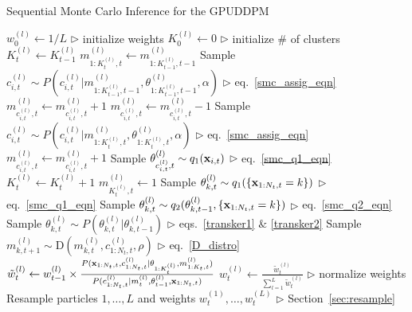 \documentclass[twocolumn, final]{svjour3}
\begin{document}
\begin{algorithm*}[!]
\caption{Sequential Monte Carlo Inference for the GPUDDPM}
\label{alg:SMC}
\begin{algorithmic}[1]
\STATE $w_{0}^{(l)} \leftarrow 1/L$ \hfill $\triangleright$ initialize weights
\ENDFOR
\STATE $K_{0}^{(l)} \leftarrow 0$ \hfill $\triangleright$ initialize \# of clusters
\STATE $K_{t}^{(l)}  \leftarrow K_{t-1}^{(l)}$
\STATE $m_{1:K_{t}^{(l)}, t}^{(l)} \leftarrow m_{1:K_{t-1}^{(l)}, t-1}^{(l)}$
\STATE Sample $c_{i,t}^{(l)} \sim P \left( c_{i,t}^{(l)} | m_{1:K_{t-1}^{(l)}, t-1}^{(l)}, \theta_{1:K_{t-1}^{(l)}, t-1}^{(l)}, \alpha \right)$  \hfill $\triangleright$ eq.~\eqref{smc_assig_eqn}
\STATE $m_{c_{i,t}^{(l)},t}^{(l)} \leftarrow m_{c_{i,t}^{(l)},t}^{(l)} + 1$
\ELSE
\STATE $m_{c_{i,t}^{(l)},t}^{(l)} \leftarrow m_{c_{i,t}^{(l)},t}^{(l)} - 1$
\STATE Sample $c_{i,t}^{(l)} \sim P \left( c_{i,t}^{(l)} | m_{1:K_{t}^{(l)}, t}^{(l)}, \theta_{1:K_{t}^{(l)}, t}^{(l)}, \alpha \right)$  \hfill $\triangleright$ eq.~\eqref{smc_assig_eqn}
\STATE $m_{c_{i,t}^{(l)},t}^{(l)} \leftarrow m_{c_{i,t}^{(l)},t}^{(l)} + 1$
\ENDIF
{}
\STATE Sample $\theta_{c_{i,t}^{(l)}, t}^{(l)} \sim q_{1}(\bold{x}_{i,t})$ \hfill $\triangleright$ eq.~\eqref{smc_q1_eqn}
\STATE $K_{t}^{(l)} \leftarrow K_{t}^{(l)} + 1$
\STATE $m_{K_{t}^{(l)},t}^{(l)} \leftarrow 1$
\ENDIF
\ENDFOR
{}
\STATE Sample $\theta_{k,t}^{(l)} \sim q_{1}(\{ \bold{x}_{1:N_{t}, t} = k \})$  \hfill $\triangleright$ eq.~\eqref{smc_q1_eqn}
\STATE Sample $\theta_{k,t}^{(l)} \sim q_{2}(\theta_{k,t-1}^{(l)}, \{ \bold{x}_{1:N_{t}, t} = k \})$  \hfill $\triangleright$ eq.~\eqref{smc_q2_eqn}
\STATE Sample $\theta_{k,t}^{(l)} \sim P(\theta_{k,t}^{(l)} | \theta_{k,t-1}^{(l)})$  \hfill $\triangleright$ eqs.~\eqref{transker1} $\&$ \eqref{transker2}
\ENDIF
{}
\STATE Sample $m_{k,t+1}^{(l)} \sim \text{D}(m_{k,t}^{(l)}, c_{1:N_{t}, t}^{(l)}, \rho)$  \hfill $\triangleright$ eq.~\eqref{D_distro}
\ENDIF
\ENDFOR
\ENDFOR
\STATE $\tilde{w}_{t}^{(l)} \leftarrow w_{t-1}^{(l)} \times \frac{ P(\bold{x}_{1:N_{t},t}, c_{1:N_{t}, t}^{(l)} | \theta_{1:K_{t}^{(l)}}, m_{1:K_{t},t}^{(l)})} {P(c_{1:N_{t}, t}^{(l)} | m_{t}^{(l)}, \theta_{t-1}^{(l)}, \bold{x}_{1:N_{t},t} ) } $%
\ENDFOR
{}
\STATE $w_{t}^{(l)} \leftarrow \frac{\tilde{w}_{t}^{(l)}}{\sum_{l=1}^{L} \tilde{w}_{t}^{(l)} }$   \hfill $\triangleright$ normalize weights
\ENDFOR
\STATE Resample particles $1, \ldots, L$ and weights $w_{t}^{(1)}, \ldots, w_{t}^{(L)}$   \hfill $\triangleright$ Section~\ref{sec:resample}
\ENDFOR
\end{algorithmic}
\end{algorithm*}
\end{document}
